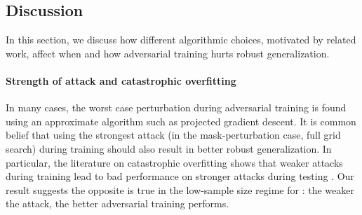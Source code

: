 \subsection{Discussion}

In this section, we discuss how different algorithmic choices, motivated
by related work, affect when and how adversarial training hurts robust generalization. 

\paragraph{Strength of attack and catastrophic overfitting}
In many cases, the worst case perturbation during adversarial training is found using an approximate algorithm such as projected gradient descent. It is common belief  that using the strongest attack (in the mask-perturbation case, full grid search) during training should also result in better robust generalization. 
In particular, the literature on catastrophic overfitting shows that weaker attacks during training lead to bad performance on stronger attacks during testing  \cite{Wong20Fast, andriushchenko20, li21}.
Our result suggests the opposite is true in the low-sample size regime for
\nameofattacks : the weaker the attack, the better
adversarial training performs.




